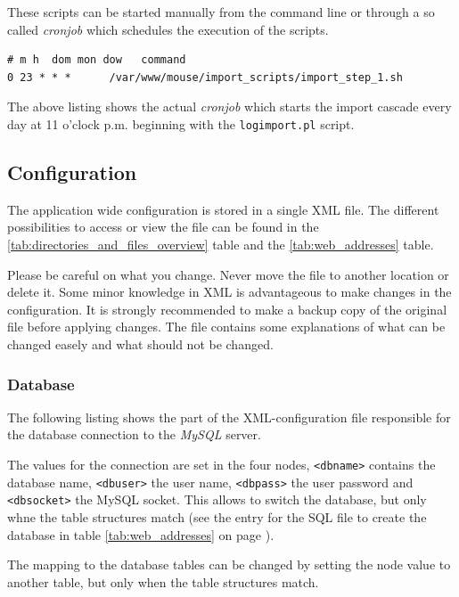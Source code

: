 \documentclass[a4paper,10pt,twoside,headings=small,bibliography=totocnumbered,headsepline]{scrartcl}
\begin{document}
\begin{appendix}
These scripts can be started manually from the command line or through a so called \textit{cronjob} which schedules the execution of the scripts.

\codefoot
\begin{lstlisting}[frame=none]
 # m h  dom mon dow   command
0 23 * * *      /var/www/mouse/import_scripts/import_step_1.sh   
\end{lstlisting}

The above listing shows the actual \textit{cronjob} which starts the import cascade every day at 11 o'clock p.m. beginning with the \lstinline|logimport.pl| script.

\newpage
\subsection{Configuration}
\label{app:config} 

The application wide configuration is stored in a single XML file. The different possibilities to access or view the file can be found in the \ref{tab:directories_and_files_overview} table and the \ref{tab:web_addresses} table.

Please be careful on what you change. Never move the file to another location or delete it. Some minor knowledge in XML is advantageous to make changes in the configuration. It is strongly recommended to make a backup copy of the original file before applying changes. The file contains some explanations of what can be changed easely and what should not be changed.

\numcodestyle
\lstset{language=XML}    

\subsubsection{Database}
\label{app:configdb}

The following listing shows the part of the XML-configuration file responsible for the database connection to the \textit{MySQL} server. 

The values for the connection are set in the four nodes, \lstinline|<dbname>| contains the database name, \lstinline|<dbuser>| the user name, \lstinline|<dbpass>| the user password and \lstinline|<dbsocket>| the MySQL socket. This allows to switch the database, but only whne the table structures match (see the entry for the SQL file to create the database in table \ref{tab:web_addresses} on page \pageref{tab:web_addresses}).

The mapping to the database tables can be changed by setting the node value to another table, but only when the table structures match.


\end{appendix}
\end{document}
